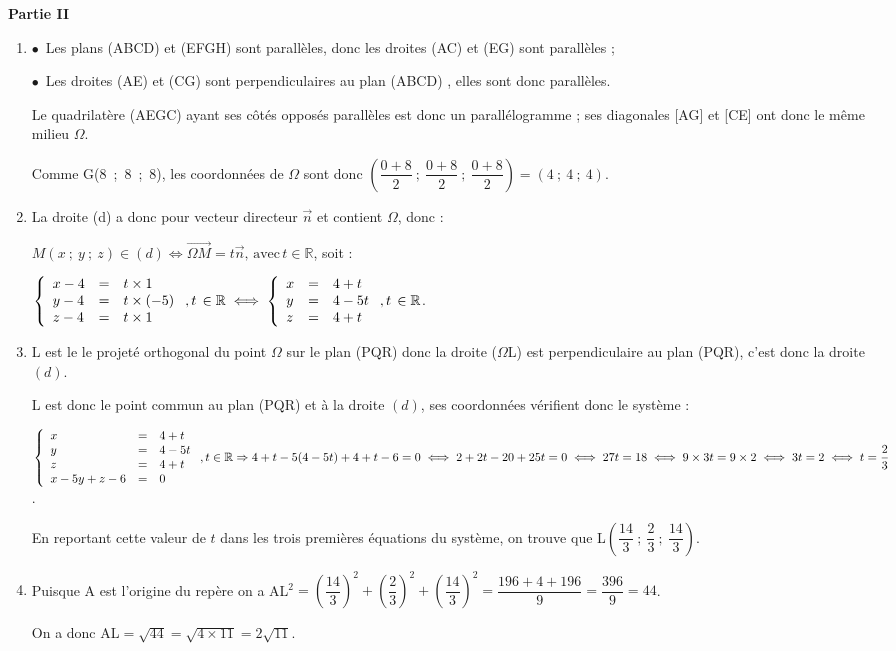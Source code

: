\documentclass[10pt]{article}
\providecommand{\starredbullet}{\ensuremath{\bullet}}
\providecommand{\R}{\mathbb{R}}
\providecommand{\vect}[1]{\overrightarrow{#1}}
\begin{document}
\textbf{Partie II}

\medskip





\begin{enumerate}
\item 
\starredbullet~Les plans (ABCD) et (EFGH) sont parallèles, donc les droites (AC) et (EG) sont parallèles ;

\starredbullet~Les droites (AE) et (CG) sont perpendiculaires au plan (ABCD) , elles sont donc  parallèles.

Le quadrilatère (AEGC) ayant ses côtés opposés parallèles est donc un parallélogramme  ; ses diagonales [AG] et [CE] ont donc le même milieu $\Omega$.

Comme G(8~;~8~;~8), les coordonnées de $\Omega$ sont donc $\left(\dfrac{0 + 8}{2}~;~\dfrac{0 + 8}{2}~;~\dfrac{0 + 8}{2}\right) = (4~;~4~;~4)$.
\item 
La droite (d) a donc pour vecteur directeur $\vect{n}$ et contient $\Omega$, donc :

$M(x~;~y~;~z) \in (d) \iff \vect{\Omega M} = t\vect{n}, \, \text{avec}\, t \in \R$, soit :

$\left\{\begin{array}{l c l}
x - 4&=&t \times 1\\
y - 4&=&t \times (- 5)\\
z - 4&=&t \times 1
\end{array}\right., t\, \in \R \iff \left\{\begin{array}{l c l}
x &=&4 + t\\
y &=&4 - 5t\\
z &=&4 + t
\end{array}\right., t \, \in \R $.
\item 
L est le le projeté orthogonal du point $\Omega$ sur le plan (PQR) donc la droite ($\Omega$L) est perpendiculaire au plan (PQR), c'est donc la droite $(d)$.

L est donc le point commun au plan (PQR) et à la droite $(d)$, ses coordonnées vérifient donc le système :

$\left\{\begin{array}{l c l}
x &=&4 + t\\
y &=&4 - 5t\\
z &=&4 + t\\
 x - 5y + z  - 6 &=& 0
\end{array}\right., t \in \R \Rightarrow 4 + t  - 5(4 - 5t) + 4 + t - 6 = 0 \iff 2 + 2t - 20 + 25t = 0 \iff 27t = 18 \iff 9 \times 3t = 9 \times 2 \iff 3t = 2 \iff t = \dfrac{2}{3}$.

En reportant cette valeur de $t$ dans les trois premières équations du système, on trouve que L$\left(\dfrac{14}{3}~;~ \dfrac{2}{3}~;~\dfrac{14}{3}\right)$.
\item 
Puisque A est l'origine du repère on a AL$^2 = \left(\dfrac{14}{3}\right)^2 + \left(\dfrac{2}{3}\right)^2 + \left(\dfrac{14}{3}\right)^2 =  \dfrac{196 + 4 + 196}{9} = \dfrac{396}{9} = 44$.

On a donc AL$ = \sqrt{44} = \sqrt{4 \times 11} = 2\sqrt{11}$.
\end{enumerate}


\bigskip
\end{document}
